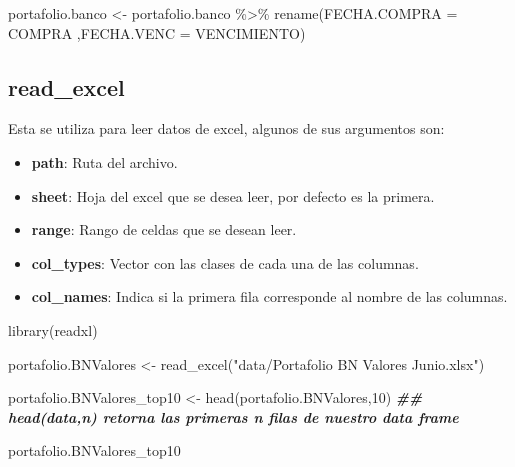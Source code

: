 \documentclass[
  12pt,
]{book}
\newenvironment{Shaded}{\begin{snugshade}}{\end{snugshade}}
\newcommand{\AttributeTok}[1]{\textcolor[rgb]{0.77,0.63,0.00}{#1}}
\newcommand{\DecValTok}[1]{\textcolor[rgb]{0.00,0.00,0.81}{#1}}
\newcommand{\DocumentationTok}[1]{\textcolor[rgb]{0.56,0.35,0.01}{\textbf{\textit{#1}}}}
\newcommand{\FunctionTok}[1]{\textcolor[rgb]{0.00,0.00,0.00}{#1}}
\newcommand{\NormalTok}[1]{#1}
\newcommand{\OtherTok}[1]{\textcolor[rgb]{0.56,0.35,0.01}{#1}}
\newcommand{\SpecialCharTok}[1]{\textcolor[rgb]{0.00,0.00,0.00}{#1}}
\newcommand{\StringTok}[1]{\textcolor[rgb]{0.31,0.60,0.02}{#1}}
\providecommand{\tightlist}{%
  \setlength{\itemsep}{0pt}\setlength{\parskip}{0pt}}
\begin{document}
\begin{Shaded}
\begin{Highlighting}[]
\NormalTok{portafolio.banco }\OtherTok{\textless{}{-}}\NormalTok{ portafolio.banco }\SpecialCharTok{\%\textgreater{}\%} \FunctionTok{rename}\NormalTok{(}\AttributeTok{FECHA.COMPRA =}\NormalTok{ COMPRA ,}\AttributeTok{FECHA.VENC =}\NormalTok{ VENCIMIENTO)}
\end{Highlighting}
\end{Shaded}

\hypertarget{read_excel}{%
\subsection{\texorpdfstring{\textbf{read\_excel}}{read\_excel}}\label{read_excel}}

Esta se utiliza para leer datos de excel, algunos de sus argumentos son:

\begin{itemize}
\tightlist
\item
  \textbf{path}: Ruta del archivo.
\item
  \textbf{sheet}: Hoja del excel que se desea leer, por defecto es la primera.
\item
  \textbf{range}: Rango de celdas que se desean leer.
\item
  \textbf{col\_types}: Vector con las clases de cada una de las columnas.
\item
  \textbf{col\_names}: Indica si la primera fila corresponde al nombre de las columnas.
\end{itemize}

\begin{Shaded}
\begin{Highlighting}[]
\FunctionTok{library}\NormalTok{(readxl)}


\NormalTok{portafolio.BNValores }\OtherTok{\textless{}{-}} \FunctionTok{read\_excel}\NormalTok{(}\StringTok{"data/Portafolio BN Valores Junio.xlsx"}\NormalTok{)}

\NormalTok{portafolio.BNValores\_top10 }\OtherTok{\textless{}{-}} \FunctionTok{head}\NormalTok{(portafolio.BNValores,}\DecValTok{10}\NormalTok{) }\DocumentationTok{\#\# head(data,n) retorna las primeras n filas de nuestro data frame}

\NormalTok{portafolio.BNValores\_top10}
\end{Highlighting}
\end{Shaded}
\end{document}
